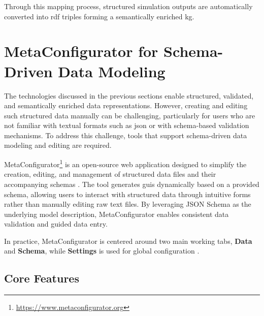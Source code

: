 Through this mapping process, structured simulation outputs are automatically converted into \gls{rdf} triples forming a semantically enriched \gls{kg}. 

\section{MetaConfigurator for Schema-Driven Data Modeling}
\label{sec:background:metaconfigurator}

The technologies discussed in the previous sections enable structured, validated, and semantically enriched data representations. However, creating and editing such structured data manually can be challenging, particularly for users who are not familiar with textual formats such as \gls{json} or with schema-based validation mechanisms. To address this challenge, tools that support schema-driven data modeling and editing are required.

MetaConfigurator\footnote{\url{https://www.metaconfigurator.org}} is an open-source web application designed to simplify the creation, editing, and management of structured data files and their accompanying schemas \cite{metaconfigurator2024,metaconfigurator2025datamodels}. The tool generates \glspl{gui} dynamically based on a provided schema, allowing users to interact with structured data through intuitive forms rather than manually editing raw text files. By leveraging JSON Schema as the underlying model description, MetaConfigurator enables consistent data validation and guided data entry.

In practice, MetaConfigurator is centered around two main working tabs, \textbf{Data} and \textbf{Schema}, while \textbf{Settings} is used for global configuration \cite{metaconfigurator2025datamodels}.

\subsection{Core Features}

